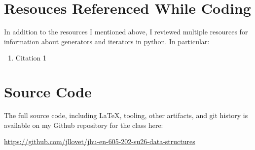\documentclass[10pt,letterpaper,final]{report}
\begin{document}
\pagebreak

\section{Resouces Referenced While Coding}

In addition to the resources I mentioned above, I reviewed multiple resources for information about generators and iterators in python. In particular:

\begin{enumerate}
  \item Citation 1
\end{enumerate}

\pagebreak

\section{Source Code}
The full source code, including LaTeX, tooling, other artifacts, and git history is available on my Github repository for the class here:
\begin{center}
  \url{https://github.com/jllovet/jhu-en-605-202-su26-data-structures}
\end{center}

\printbibliography[heading=bibintoc]
\end{document}
